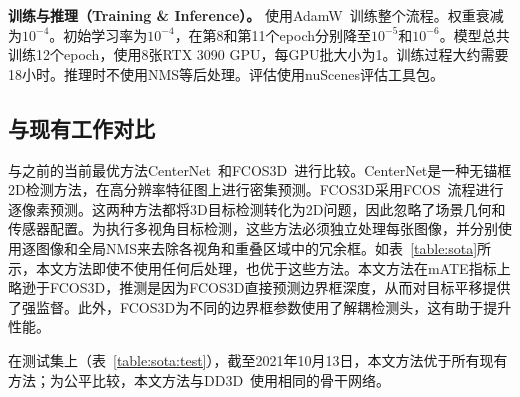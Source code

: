 \textbf{训练与推理（Training \& Inference）。} 使用AdamW~\cite{loshchilov2018decoupled}训练整个流程。权重衰减为$10^{-4}$。初始学习率为$10^{-4}$，在第8和第11个epoch分别降至$10^{-5}$和$10^{-6}$。模型总共训练12个epoch，使用8张RTX 3090 GPU，每GPU批大小为1。训练过程大约需要18小时。推理时不使用NMS等后处理。评估使用nuScenes评估工具包。

\subsection{与现有工作对比}
\label{sota}
与之前的当前最优方法CenterNet~\cite{zhou2019centernet}和FCOS3D~\cite{wang2021fcos3d}进行比较。CenterNet是一种无锚框2D检测方法，在高分辨率特征图上进行密集预测。FCOS3D采用FCOS~\cite{tian2019fcos}流程进行逐像素预测。这两种方法都将3D目标检测转化为2D问题，因此忽略了场景几何和传感器配置。为执行多视角目标检测，这些方法必须独立处理每张图像，并分别使用逐图像和全局NMS来去除各视角和重叠区域中的冗余框。如表~\ref{table:sota}所示，本文方法即使不使用任何后处理，也优于这些方法。本文方法在mATE指标上略逊于FCOS3D，推测是因为FCOS3D直接预测边界框深度，从而对目标平移提供了强监督。此外，FCOS3D为不同的边界框参数使用了解耦检测头，这有助于提升性能。

在测试集上（表~\ref{table:sota:test}），截至2021年10月13日，本文方法优于所有现有方法；为公平比较，本文方法与DD3D~\cite{dd3d}使用相同的骨干网络。


